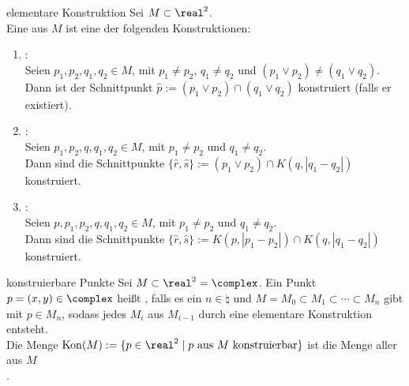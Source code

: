 \begin{Def}{elementare Konstruktion}
    Sei $M \subset \real^2$.\\
    Eine  aus $M$ ist eine der folgenden
    Konstruktionen:
    \begin{enumerate}[label=\Roman*.]
        \item
        :\\
        Seien $p_1, p_2, q_1, q_2 \in M$,
        mit $p_1 \not= p_2$, $q_1 \not= q_2$ und
        $(p_1 \lor p_2) \not= (q_1 \lor q_2)$.\\
        Dann ist der Schnittpunkt
        $\widehat{p} := (p_1 \lor p_2) \cap (q_1 \lor q_2)$
        konstruiert (falls er existiert).
        
        \item
        :\\
        Seien $p_1, p_2, q, q_1, q_2 \in M$,
        mit $p_1 \not= p_2$ und $q_1 \not= q_2$.\\
        Dann sind die Schnittpunkte
        $\{\widehat{r}, \widehat{s}\} := (p_1 \lor p_2) \cap K(q, |q_1 - q_2|)$
        konstruiert.
        
        \item
        :\\
        Seien $p, p_1, p_2, q, q_1, q_2 \in M$,
        mit $p_1 \not= p_2$ und $q_1 \not= q_2$.\\
        Dann sind die Schnittpunkte
        $\{\widehat{r}, \widehat{s}\} :=
        K(p, |p_1 - p_2|) \cap K(q, |q_1 - q_2|)$
        konstruiert.
    \end{enumerate}
\end{Def}

\begin{Def}{konstruierbare Punkte}
    Sei $M \subset \real^2 = \complex$.
    Ein Punkt $p = (x, y) \in \complex$ heißt
    , falls
    es ein $n \in \natural$ und
    $M = M_0 \subset M_1 \subset \dotsb \subset M_n$
    gibt mit $p \in M_n$, sodass jedes $M_i$ aus $M_{i-1}$ durch eine
    elementare Konstruktion entsteht.\\
    Die Menge $\Kon(M) := \{p \in \real^2 \;|\;
    p \text{ aus } M \text{ konstruierbar}\}$ ist die Menge aller aus $M$\\
    .
\end{Def}

